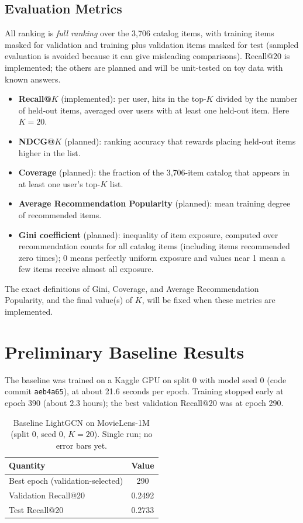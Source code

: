 \documentclass{article}
\begin{document}
\subsection{Evaluation Metrics}
All ranking is \emph{full ranking} over the 3,706 catalog items, with training items masked for validation and training plus validation items masked for test (sampled evaluation is avoided because it can give misleading comparisons). Recall@20 is implemented; the others are planned and will be unit-tested on toy data with known answers.
\begin{itemize}
  \item \textbf{Recall@$K$} (implemented): per user, hits in the top-$K$ divided by the number of held-out items, averaged over users with at least one held-out item. Here $K=20$.
  \item \textbf{NDCG@$K$} (planned): ranking accuracy that rewards placing held-out items higher in the list.
  \item \textbf{Coverage} (planned): the fraction of the 3,706-item catalog that appears in at least one user's top-$K$ list.
  \item \textbf{Average Recommendation Popularity} (planned): mean training degree of recommended items.
  \item \textbf{Gini coefficient} (planned): inequality of item exposure, computed over recommendation counts for all catalog items (including items recommended zero times); 0 means perfectly uniform exposure and values near 1 mean a few items receive almost all exposure.
\end{itemize}
The exact definitions of Gini, Coverage, and Average Recommendation Popularity, and the final value(s) of $K$, will be fixed when these metrics are implemented.

\section{Preliminary Baseline Results}

The baseline was trained on a Kaggle GPU on split 0 with model seed 0 (code commit \texttt{aeb4a65}), at about 21.6 seconds per epoch. Training stopped early at epoch 390 (about 2.3 hours); the best validation Recall@20 was at epoch 290.

\begin{table}[h]
  \caption{Baseline LightGCN on MovieLens-1M (split 0, seed 0, $K=20$). Single run; no error bars yet.}
  \label{tab:baseline}
  \centering
  \begin{tabular}{lc}
    \toprule
    Quantity & Value \\
    \midrule
    Best epoch (validation-selected) & 290 \\
    Validation Recall@20 & 0.2492 \\
    Test Recall@20 & 0.2733 \\
    \bottomrule
  \end{tabular}
\end{table}
\end{document}
